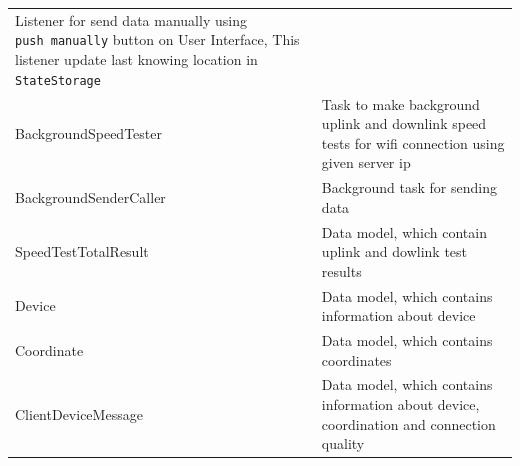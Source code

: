 \begin{longtable}[]{@{}ll@{}}
\begin{minipage}[t]{0.47\columnwidth}
Listener for send data manually using \texttt{push\ manually} button on
User Interface, This listener update last knowing location in
\texttt{StateStorage}\strut
\end{minipage}\tabularnewline
\begin{minipage}[t]{0.47\columnwidth}\raggedright
BackgroundSpeedTester\strut
\end{minipage} & \begin{minipage}[t]{0.47\columnwidth}\raggedright
Task to make background uplink and downlink speed tests for wifi
connection using given server ip\strut
\end{minipage}\tabularnewline
\begin{minipage}[t]{0.47\columnwidth}\raggedright
BackgroundSenderCaller\strut
\end{minipage} & \begin{minipage}[t]{0.47\columnwidth}\raggedright
Background task for sending data\strut
\end{minipage}\tabularnewline
\begin{minipage}[t]{0.47\columnwidth}\raggedright
SpeedTestTotalResult\strut
\end{minipage} & \begin{minipage}[t]{0.47\columnwidth}\raggedright
Data model, which contain uplink and dowlink test results\strut
\end{minipage}\tabularnewline
\begin{minipage}[t]{0.47\columnwidth}\raggedright
Device\strut
\end{minipage} & \begin{minipage}[t]{0.47\columnwidth}\raggedright
Data model, which contains information about device\strut
\end{minipage}\tabularnewline
\begin{minipage}[t]{0.47\columnwidth}\raggedright
Coordinate\strut
\end{minipage} & \begin{minipage}[t]{0.47\columnwidth}\raggedright
Data model, which contains coordinates\strut
\end{minipage}\tabularnewline
\begin{minipage}[t]{0.47\columnwidth}\raggedright
ClientDeviceMessage\strut
\end{minipage} & \begin{minipage}[t]{0.47\columnwidth}\raggedright
Data model, which contains information about device, coordination and
connection quality\strut
\end{minipage}\tabularnewline
\bottomrule
\end{longtable}
